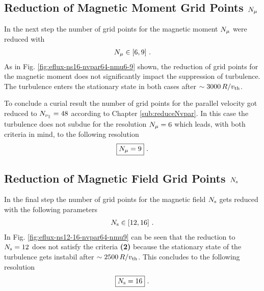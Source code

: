 \subsection{Reduction of Magnetic Moment Grid Points $N_\mu$}
\label{sub:reduceNmu}

In the next step the number of grid points for the magnetic moment $N_\mu$ were reduced with
\begin{gather*}
	N_\mu \in [6, 9] ~.
\end{gather*}
As in Fig. \ref{fig:eflux-ns16-nvpar64-nmu6-9} shown, the reduction of grid points for the magnetic moment does not significantly impact the suppression of turbulence. The turbulence enters the stationary state in both cases after $\sim 3000\,R/v_{\mathrm{th}}$.  


To conclude a curial result the number of grid points for the parallel velocity got reduced to $N_{\nu_\parallel} = 48$ according to Chapter \ref{sub:reduceNvpar}. In this case the turbulence does not subdue for the resolution $N_\mu = 6$ which leads, with both criteria in mind, to the following resolution
\begin{gather*}
	\boxed{N_\mu = 9}~.
\end{gather*}


\subsection{Reduction of Magnetic Field Grid Points $N_\mathrm{s}$}
\label{sub:reduceNs}

In the final step the number of grid points for the magnetic field $N_\mathrm{s}$ gets reduced with the following parameters
\begin{gather*}
	N_\mathrm{s} \in [12, 16]~.
\end{gather*}
In Fig. \ref{fig:eflux-ns12-16-nvpar64-nmu9} can be seen that the reduction to $N_\mathrm{s} = 12$ does not satisfy the criteria \textbf{(2)} because the stationary state of the turbulence gets instabil after $\sim 2500\,R/v_{\mathrm{th}}$. This concludes to the following resolution
\begin{gather*}
	\boxed{N_\mathrm{s} = 16}~.
\end{gather*}

